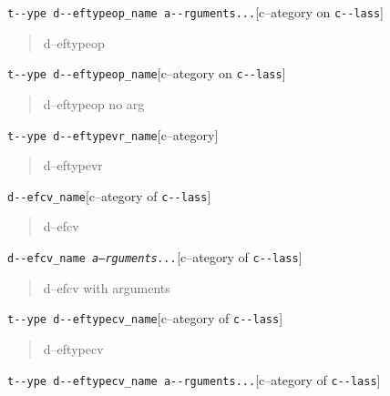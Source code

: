 \documentclass{book}
\begin{document}
\begin{titlepage}
\noindent\texttt{t{-}{-}ype d{-}{-}eftypeop\_name a{-}{-}rguments...}\hfill[c--ategory on \texttt{c{-}{-}lass}]



%
\begin{quote}
d--eftypeop
\end{quote}

\noindent\texttt{t{-}{-}ype d{-}{-}eftypeop\_name}\hfill[c--ategory on \texttt{c{-}{-}lass}]



%
\begin{quote}
d--eftypeop no arg
\end{quote}

\noindent\texttt{t{-}{-}ype d{-}{-}eftypevr\_name}\hfill[c--ategory]



%
\begin{quote}
d--eftypevr
\end{quote}

\noindent\texttt{d{-}{-}efcv\_name}\hfill[c--ategory of \texttt{c{-}{-}lass}]



%
\begin{quote}
d--efcv
\end{quote}

\noindent\texttt{d{-}{-}efcv\_name \EmbracOn{}\textnormal{\textsl{a--rguments...}}\EmbracOff{}}\hfill[c--ategory of \texttt{c{-}{-}lass}]



%
\begin{quote}
d--efcv with arguments
\end{quote}

\noindent\texttt{t{-}{-}ype d{-}{-}eftypecv\_name}\hfill[c--ategory of \texttt{c{-}{-}lass}]



%
\begin{quote}
d--eftypecv
\end{quote}

\noindent\texttt{t{-}{-}ype d{-}{-}eftypecv\_name a{-}{-}rguments...}\hfill[c--ategory of \texttt{c{-}{-}lass}]




\end{titlepage}
\end{document}
